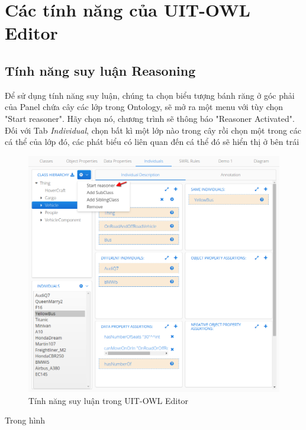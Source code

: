 \section{Các tính năng của UIT-OWL Editor}

\subsection{Tính năng suy luận Reasoning}
Để sử dụng tính năng suy luận, chúng ta chọn biểu tượng bánh răng ở góc phải của Panel chứa cây các lớp trong Ontology, sẽ mở ra một menu với tùy chọn "Start reasoner". Hãy chọn nó, chương trình sẽ thông báo "Reasoner Activated". Đối với Tab \textit{Individual}, chọn bất kì một lớp nào trong cây rồi chọn một trong các cá thể của lớp đó, các phát biểu có liên quan đến cá thể đó sẽ hiển thị ở bên trái
\begin{figure}[h!]
	\centering
	\includegraphics[width=150mm]{Figures/owleditor_reasoning.png}
	\caption{Tính năng suy luận trong UIT-OWL Editor\label{overflow}}
\end{figure}
Trong hình 












